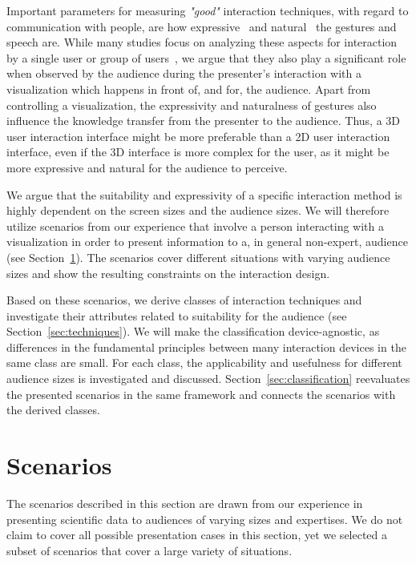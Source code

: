 \documentclass[journal]{vgtc}                %
\begin{document}
Important parameters for measuring \emph{"good"} interaction techniques, with regard to communication with people, are how expressive~\cite{Brewster:2009:MIE:2227763.2227769} and natural~\cite{O'hara:2013:NTP:2442106.2442111} the gestures and speech are.
While many studies focus on analyzing these aspects for interaction by a single user or group of users~\cite{978-3-642-12552-2, Caridakis:2013:NIE:2504335.2504378}, we argue that they also play a significant role when observed by the audience during the presenter's interaction with a visualization which happens in front of, and for, the audience.
Apart from controlling a visualization, the expressivity and naturalness of gestures also influence the knowledge transfer from the presenter to the audience. Thus, a 3D user interaction interface might be more preferable than a 2D user interaction interface, even if the 3D interface is more complex for the user, as it might be more expressive and natural for the audience to perceive.

We argue that the suitability and expressivity of a specific interaction method is highly dependent on the screen sizes and the audience sizes.
We will therefore utilize scenarios from our experience that involve a person interacting with a visualization in order to present information to a, in general non-expert, audience (see Section~\ref{sec:scenario}).
The scenarios cover different situations with varying audience sizes and show the resulting constraints on the interaction design.

Based on these scenarios, we derive classes of interaction techniques and investigate their attributes related to suitability for the audience (see Section~\ref{sec:techniques}).
We will make the classification device-agnostic, as differences in the fundamental principles between many interaction devices in the same class are small.
For each class, the applicability and usefulness for different audience sizes is investigated and discussed.
Section~\ref{sec:classification} reevaluates the presented scenarios in the same framework and connects the scenarios with the derived classes.

%
%
%
\section{Scenarios} \label{sec:scenario}
The scenarios described in this section are drawn from our experience in presenting scientific data to audiences of varying sizes and expertises.
We do not claim to cover all possible presentation cases in this section, yet we selected a subset of scenarios that cover a large variety of situations.
\end{document}
